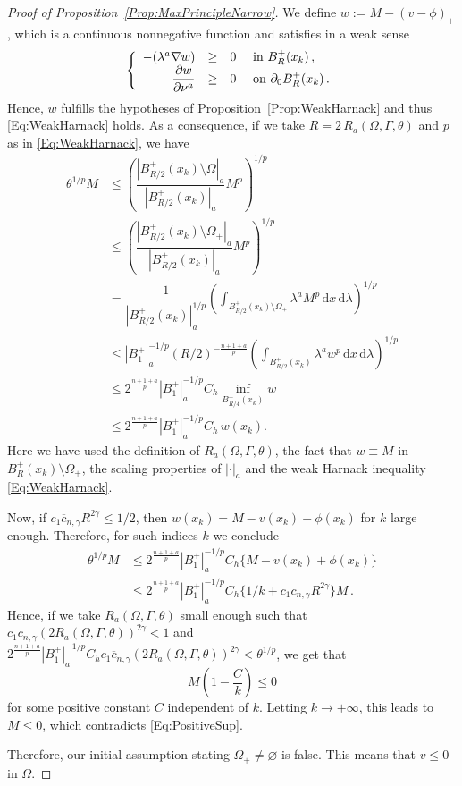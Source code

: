 \documentclass[twoside,leqno,symbols-for-thanks, draft]{rmi}
\numberwithin{equation}{section}
\theoremstyle{definition}
\newcommand{\s}{\gamma}
\renewcommand{\d}{\,\mathrm{d}} %
\newcommand{\bpar}[1]{\left ( {#1}\right )}
\newcommand\beqc[1]{\left\{\begin{array}{#1}}
\newcommand\eeqc{\end{array} \right.}
\def\PDEsystem{rcll}
\let\div\relax
\DeclareMathOperator{\div}{div}
\begin{document}
\begin{proof}[Proof of Proposition~\ref{Prop:MaxPrincipleNarrow}]
	We define $w := M -(v-\phi)_+$, which is a continuous nonnegative function and satisfies in a weak sense
	$$
	\beqc{\PDEsystem}
	-\div(\lambda^a \nabla w) &\geq & 0 & \text{ in } B^+_R(x_k) \,, \\
	\dfrac{\partial w}{\partial \nu^a} & \geq & 0 & \text{ on } \partial_0 B^+_R(x_k)  \,.
	\eeqc
	$$
	Hence, $w$ fulfills the hypotheses of Proposition~\ref{Prop:WeakHarnack} and thus \eqref{Eq:WeakHarnack} holds. As a consequence, if we take $R = 2\,R_a( \Omega,\Gamma, \theta)$ and $p$ as in \eqref{Eq:WeakHarnack}, we have
	\begin{align*}
	\theta^{1/p} M & \leq \left (  \dfrac{|B^+_{R/2}(x_k)\setminus   \Omega|_a}{|B^+_{R/2}(x_k)|_a}  M^p \right)^{1/p} \\
	& \leq \left (  \dfrac{|B^+_{R/2}(x_k)\setminus  \Omega_+|_a}{|B^+_{R/2}(x_k)|_a}  M^p \right)^{1/p} \\
	&= \dfrac{1}{|B^+_{R/2}(x_k)|_a^{1/p}}  \left (  \int_{B^+_{R/2}(x_k)\setminus  \Omega_+} \lambda ^a M^p \d x \d \lambda  \right)^{1/p} \\
	&\leq |B_1^+|_a^{-1/p} (R/2)^{- \frac{n+1+a}{p}} \left (  \int_{B^+_{R/2}(x_k)} \lambda ^a w^p \d x \d \lambda  \right)^{1/p} \\
	&\leq 2^{\frac{n+1+a}{p}}|B_1^+|_a^{-1/p} C_h \inf_{B^+_{R/4}(x_k)} w \\
	& \leq 2^{\frac{n+1+a}{p}}|B_1^+|_a^{-1/p} C_h \,  w(x_k).
	\end{align*}
	Here we have used the definition of $R_a( \Omega,\Gamma,\theta)$, the fact that $w \equiv M$ in $B^+_R(x_k)\setminus \Omega_+$, the scaling properties of $|\cdot |_a$ and the weak Harnack inequality \eqref{Eq:WeakHarnack}. 
	
	Now, if $c_1 \overline{c}_{n,\s} R^{2\s} \leq 1/2$, then $w(x_k) = M - v(x_k) + \phi(x_k)$ for $k$ large enough. Therefore, for such indices $k$ we conclude
	\begin{align*}
	\theta^{1/p} M &\leq  2^{\frac{n+1+a}{p}}|B_1^+|_a^{-1/p} C_h \{M - v(x_k) + \phi(x_k) \} \\
	& \leq 2^{\frac{n+1+a}{p}}|B_1^+|_a^{-1/p} C_h \{1/k + c_1  \overline{c}_{n,\s} R^{2\s} \}M\,.
	\end{align*}
	Hence, if we take $R_a( \Omega,\Gamma, \theta)$ small enough such that $c_1 \overline{c}_{n,\s} (2 R_a( \Omega,\Gamma, \theta))^{2\s} < 1$ and $ 2^{\frac{n+1+a}{p}} |B_1^+|_a^{-1/p} C_h c_1 \overline{c}_{n,\s} (2 R_a( \Omega,\Gamma, \theta))^{2\s} < \theta^{1/p}$, we get that
	$$
	M \bpar{1- \dfrac{C}{k}}\leq 0
	$$
	for some positive constant $C$ independent of $k$. Letting $k\to +\infty$, this leads to $M \leq 0$, which contradicts \eqref{Eq:PositiveSup}. 
	
	Therefore, our initial assumption stating $ \Omega_+ \neq \varnothing$ is false. This means that $v\leq 0$ in $\Omega$.
\end{proof}
\end{document}
